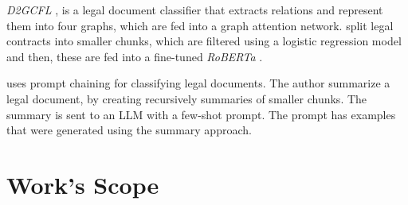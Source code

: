 \documentclass[11pt]{article}
\begin{document}

    \textit{D2GCFL} \cite{wang_d2gclf_2022}, is a legal document classifier that extracts relations and represent them into four graphs, which are fed into a graph attention network. \citet{li_dont_2023} split legal contracts into smaller chunks, which are filtered using a logistic regression model and then, these are fed into a fine-tuned \textit{RoBERTa} \cite{liu_roberta_2019}.
    

    \citet{trautmann_large_2023} uses prompt chaining for classifying legal documents. The author summarize a legal document, by creating recursively summaries of smaller chunks. The summary is sent to an LLM with a few-shot prompt. The prompt has examples that were generated using the summary approach.%

\section{Work's Scope}
\label{sec: Scope}
\end{document}

